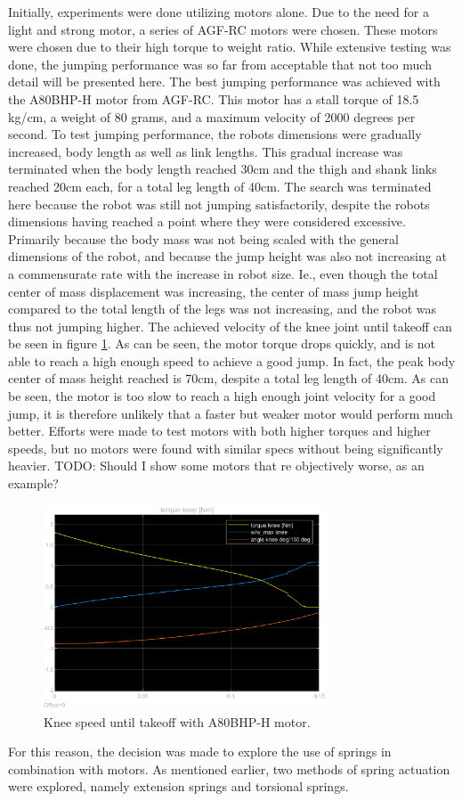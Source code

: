 Initially, experiments were done utilizing motors alone. Due to the need for a light and strong motor, a series of AGF-RC motors were chosen. These motors were chosen due to their high torque to weight ratio. While extensive testing was done, the jumping performance was so far from acceptable that not too much detail will be presented here. The best jumping performance was achieved with the A80BHP-H motor from AGF-RC. This motor has a stall torque of 18.5 kg/cm, a weight of 80 grams, and a maximum velocity of 2000 degrees per second. To test jumping performance, the robots dimensions were gradually increased, body length as well as link lengths. This gradual increase was terminated when the body length reached 30cm and the thigh and shank links reached 20cm each, for a total leg length of 40cm. The search was terminated here because the robot was still not jumping satisfactorily, despite the robots dimensions having reached a point where they were considered excessive. Primarily because the body mass was not being scaled with the general dimensions of the robot, and because the jump height was also not increasing at a commensurate rate with the increase in robot size. Ie., even though the total center of mass displacement was increasing, the center of mass jump height compared to the total length of the legs was not increasing, and the robot was thus not jumping higher. The achieved velocity of the knee joint until takeoff can be seen in figure \ref{fig:joint_speed_A80BHM}. As can be seen, the motor torque drops quickly, and is not able to reach a high enough speed to achieve a good jump. In fact, the peak body center of mass height reached is 70cm, despite a total leg length of 40cm. As can be seen, the motor is too slow to reach a high enough joint velocity for a good jump, it is therefore unlikely that a faster but weaker motor would perform much better. Efforts were made to test motors with both higher torques and higher speeds, but no motors were found with similar specs without being significantly heavier. TODO: Should I show some motors that re objectively worse, as an example? 

\begin{figure}[h]
    \centering
    \includegraphics[width=0.75\textwidth]{Images/joint_speed_A80BHM.eps}
    \caption{Knee speed until takeoff with A80BHP-H motor.}
    \label{fig:joint_speed_A80BHM}
\end{figure}

For this reason, the decision was made to explore the use of springs in combination with motors. As mentioned earlier, two methods of spring actuation were explored, namely extension springs and torsional springs. 



\subsection{}